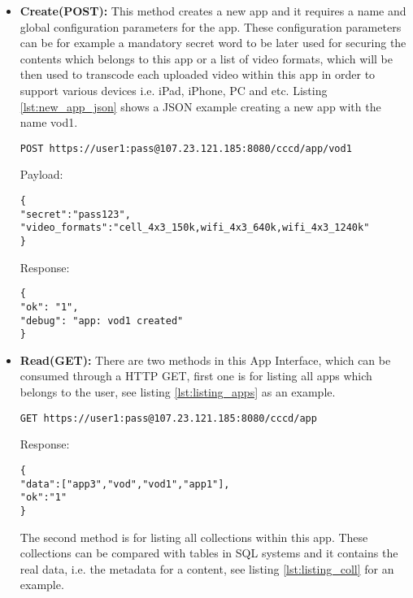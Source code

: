 \begin{itemize}
\item \textbf{Create(POST):} This method creates a new app and it requires a name and global configuration parameters for the app. These configuration parameters can be for example a mandatory secret word to be later used for securing the contents which belongs to this app or a list of video formats, which will be then used to transcode each uploaded video within this app in order to support various devices i.e. iPad, iPhone, PC and etc. Listing \ref{lst:new_app_json} shows a JSON example creating a new app with the name vod1.

\begin{code}
\begin{verbatim}
POST https://user1:pass@107.23.121.185:8080/cccd/app/vod1
\end{verbatim}
Payload:
\begin{verbatim}
{
"secret":"pass123",
"video_formats":"cell_4x3_150k,wifi_4x3_640k,wifi_4x3_1240k"
}
\end{verbatim}
Response:
\begin{verbatim}
{
"ok": "1",
"debug": "app: vod1 created"
}
\end{verbatim}
\caption{Creating a new app}
\label{lst:new_app_json}
\end{code}

\item \textbf{Read(GET):} There are two methods in this App Interface, which can be consumed through a HTTP GET, first one is for listing all apps which belongs to the user, see listing \ref{lst:listing_apps} as an example. 

\begin{code}
\begin{verbatim}
GET https://user1:pass@107.23.121.185:8080/cccd/app
\end{verbatim}
Response:
\begin{verbatim}
{
"data":["app3","vod","vod1","app1"],
"ok":"1"
}
\end{verbatim}
\caption{Listing all apps which belong to a user}
\label{lst:listing_apps}
\end{code}

The second method is for listing all collections within this app. These collections can be compared with tables in SQL systems and it contains the real data, i.e. the metadata for a content, see listing \ref{lst:listing_coll} for an example.


\end{itemize}
